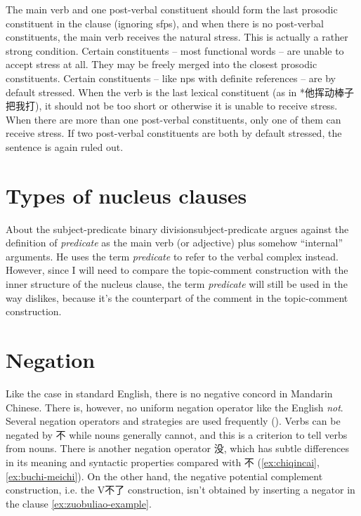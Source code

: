 \documentclass[UTF8, a4paper, oneside, scheme=plain]{ctexrep}
\newcommand*{\term}[1]{\emph{#1}}
\begin{document}
The main verb and one post-verbal constituent
should form the last prosodic constituent in the clause (ignoring \ac{sfp}s),
and when there is no post-verbal constituents,
the main verb receives the natural stress. 
This is actually a rather strong condition.
Certain constituents -- most functional words -- are unable to accept stress at all.
They may be freely merged into the closest prosodic constituents.
Certain constituents -- like \ac{np}s with definite references -- are by default stressed.
When the verb is the last lexical constituent
(as in *他挥动棒子把我打),
it should not be too short or otherwise it is unable to receive stress.
When there are more than one post-verbal constituents,
only one of them can receive stress.
If two post-verbal constituents are both by default stressed,
the sentence is again ruled out. %

\section{Types of nucleus clauses}

\begin{infobox}{About the subject-predicate binary division}{subject-predicate}
    \citet{dixon2009basic} argues against the definition of \term{predicate} 
    as the main verb (or adjective) plus somehow ``internal'' arguments.
    He uses the term \term{predicate} to refer to the verbal complex instead.
    However, since I will need to compare the topic-comment construction 
    with the inner structure of the nucleus clause,
    the term \term{predicate} will still be used in the way \citet{dixon2009basic} dislikes,
    because it's the counterpart of the comment in the topic-comment construction.
\end{infobox}



\section{Negation}\label{sec:negation}

Like the case in standard English, 
there is no negative concord in Mandarin Chinese.
There is, however, no uniform negation operator like the English \emph{not}. 
Several negation operators and strategies are used frequently ().
Verbs can be negated by 不 while nouns generally cannot, 
and this is a criterion to tell verbs from nouns. 
There is another negation operator 没, 
which has subtle differences in its meaning and syntactic properties compared with 不
(\ref{ex:chiqincai}, \ref{ex:buchi-meichi}).
On the other hand, the negative potential complement construction,
i.e. the V不了 construction,
isn't obtained by inserting a negator in the clause \eqref{ex:zuobuliao-example}.
\end{document}
